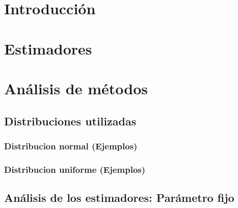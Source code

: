 \documentclass[10pt, a4paper]{article}
\author{Base de Datos, DC, UBA.}
\date{}
\title{}
\begin{document}
\thispagestyle{empty}
\titulo{}
\maketitle

\tableofcontents

\NoCaptionOfAlgo
\DontPrintSemicolon
\SetAlFnt{\ttfamily}

\newpage

\section{Introducci\'on}

	

\section{Estimadores }

	

	
\newpage

\section{An\'alisis de m\'etodos}

	\subsection{Distribuciones utilizadas}
	
		\subsubsection{Distribucion normal (Ejemplos)}	
		
					
		
		\subsubsection{Distribucion uniforme (Ejemplos)}	
		
			

	
\newpage

	\subsection{An\'alisis de los estimadores: Par\'ametro fijo}
			
\end{document}
